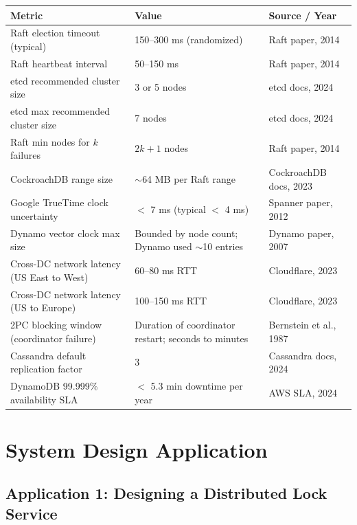 \documentclass[11pt,a4paper]{article}
\begin{document}
\begin{center}
\begin{tabular}{p{5.5cm} p{4.2cm} p{4.3cm}}
\toprule
\textbf{Metric} & \textbf{Value} & \textbf{Source / Year} \\
\midrule
Raft election timeout (typical) & 150--300 ms (randomized) & Raft paper, 2014 \\
\addlinespace
Raft heartbeat interval & 50--150 ms & Raft paper, 2014 \\
\addlinespace
etcd recommended cluster size & 3 or 5 nodes & etcd docs, 2024 \\
\addlinespace
etcd max recommended cluster size & 7 nodes & etcd docs, 2024 \\
\addlinespace
Raft min nodes for $k$ failures & $2k + 1$ nodes & Raft paper, 2014 \\
\addlinespace
CockroachDB range size & $\sim$64 MB per Raft range & CockroachDB docs, 2023 \\
\addlinespace
Google TrueTime clock uncertainty & $<$ 7 ms (typical $<$ 4 ms) & Spanner paper, 2012 \\
\addlinespace
Dynamo vector clock max size & Bounded by node count; Dynamo used $\sim$10 entries & Dynamo paper, 2007 \\
\addlinespace
Cross-DC network latency (US East to West) & 60--80 ms RTT & Cloudflare, 2023 \\
\addlinespace
Cross-DC network latency (US to Europe) & 100--150 ms RTT & Cloudflare, 2023 \\
\addlinespace
2PC blocking window (coordinator failure) & Duration of coordinator restart; seconds to minutes & Bernstein et al., 1987 \\
\addlinespace
Cassandra default replication factor & 3 & Cassandra docs, 2024 \\
\addlinespace
DynamoDB 99.999\% availability SLA & $<$ 5.3 min downtime per year & AWS SLA, 2024 \\
\bottomrule
\end{tabular}
\end{center}

\section{System Design Application}

\subsection{Application 1: Designing a Distributed Lock Service}
\end{document}
